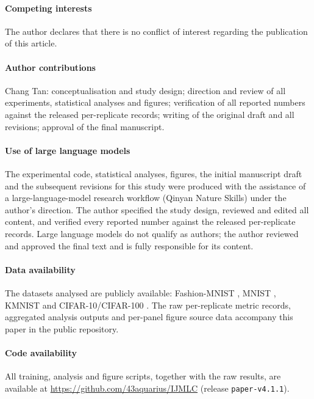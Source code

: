 \documentclass[11pt,a4paper]{article}
\begin{document}
\paragraph{Competing interests}
The author declares that there is no conflict of interest regarding
the publication of this article.

\paragraph{Author contributions}
Chang Tan: conceptualisation and study design; direction and review
of all experiments, statistical analyses and figures; verification of
all reported numbers against the released per-replicate records;
writing of the original draft and all revisions; approval of the final
manuscript.

\paragraph{Use of large language models}
The experimental code, statistical analyses, figures, the initial
manuscript draft and the subsequent revisions for this study were
produced with the assistance of a large-language-model research
workflow (Qinyan Nature Skills) under the author's direction. The
author specified the study design, reviewed and edited all content,
and verified every reported number against the released per-replicate
records. Large language models do not qualify as authors; the author
reviewed and approved the final text and is fully responsible for its
content.

\paragraph{Data availability}
The datasets analysed are publicly available: Fashion-MNIST
\citep{xiao2017}, MNIST \citep{lecun1998}, KMNIST \citep{clanuwat2018}
and CIFAR-10/CIFAR-100 \citep{krizhevsky2009}.
The raw per-replicate metric records, aggregated analysis outputs and
per-panel figure source data accompany this paper in the public
repository.

\paragraph{Code availability}
All training, analysis and figure scripts, together with the raw results,
are available at \url{https://github.com/43aquarius/IJMLC} (release
\texttt{paper-v4.1.1}).
\end{document}
